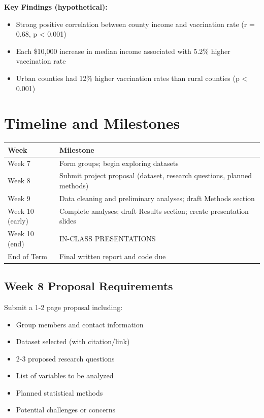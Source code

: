 \documentclass[11pt]{article}
\begin{document}
\textbf{Key Findings (hypothetical):}
\begin{itemize}
\item Strong positive correlation between county income and vaccination rate (r = 0.68, p < 0.001)
\item Each \$10,000 increase in median income associated with 5.2\% higher vaccination rate
\item Urban counties had 12\% higher vaccination rates than rural counties (p < 0.001)
\end{itemize}

\section{Timeline and Milestones}

\begin{table}[h]
\centering
\begin{tabular}{p{3cm}p{10cm}}
\toprule
\textbf{Week} & \textbf{Milestone} \\
\midrule
Week 7 & Form groups; begin exploring datasets \\
\midrule
Week 8 & Submit project proposal (dataset, research questions, planned methods) \\
\midrule
Week 9 & Data cleaning and preliminary analyses; draft Methods section \\
\midrule
Week 10 (early) & Complete analyses; draft Results section; create presentation slides \\
\midrule
Week 10 (end) & IN-CLASS PRESENTATIONS \\
\midrule
End of Term & Final written report and code due \\
\bottomrule
\end{tabular}
\end{table}

\subsection{Week 8 Proposal Requirements}

Submit a 1-2 page proposal including:
\begin{itemize}
\item Group members and contact information
\item Dataset selected (with citation/link)
\item 2-3 proposed research questions
\item List of variables to be analyzed
\item Planned statistical methods
\item Potential challenges or concerns
\end{itemize}
\end{document}
